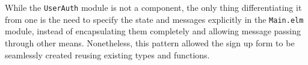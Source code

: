 While the \texttt{UserAuth} module is not a component, the only thing differentiating it from one is the need to specify the state and messages explicitly in the \texttt{Main.elm} module, instead of encapsulating them completely and allowing message passing through other means. Nonetheless, this pattern allowed the sign up form to be seamlessly created reusing existing types and functions.